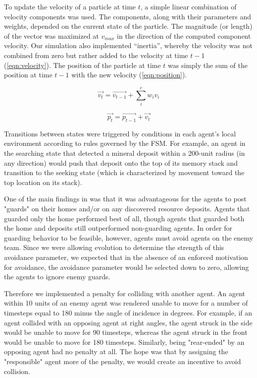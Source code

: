\documentclass[conference,final]{IEEEtran}
\begin{document}
To update the velocity of a particle at time $t$, a simple linear combination of velocity components was used. The components, along with their parameters and weights, depended on the current state of the particle. The magnitude (or length) of the vector was maximized at $v_{max}$ in the direction of the computed component velocity. Our simulation also implemented ``inertia'', whereby the velocity was not combined from zero but rather added to the velocity at time $t-1$ (\ref{eqn:velocity}). The position of the particle at time $t$ was simply the sum of the position at time $t-1$ with the new velocity (\ref{eqn:position}).

\begin{equation}
    \vec {v_t} =  \vec {v_{t-1}}+ \sum_i^c { w_i v_i}
    \label{eqn:velocity}
\end{equation}

\begin{equation}
    \vec {p_t} = \vec {p_{t-1}} + \vec {v_t}
    \label{eqn:position}
\end{equation}

Transitions between states were triggered by conditions in each agent's local environment according to rules governed by the FSM. For example, an agent in the searching state that detected a mineral deposit within a 200-unit radius (in any direction) would push that deposit onto the top of its memory stack and transition to the seeking state (which is characterized by movement toward the top location on its stack).

One of the main findings in \cite{rodriguez2004extending} was that it was advantageous for the agents to post "guards" on their homes and/or on any discovered resource deposits. Agents that guarded only the home performed best of all, though agents that guarded both the home and deposits still outperformed non-guarding agents. In order for guarding behavior to be feasible, however, agents must avoid agents on the enemy team. Since we were allowing evolution to determine the strength of this avoidance parameter, we expected that in the absence of an enforced motivation for avoidance, the avoidance parameter would be selected down to zero, allowing the agents to ignore enemy guards.

Therefore we implemented a penalty for colliding with another agent. An agent within 10 units of an enemy agent was rendered unable to move for a number of timesteps equal to 180 minus the angle of incidence in degrees. For example, if an agent collided with an opposing agent at right angles, the agent struck in the side would be unable to move for 90 timesteps, whereas the agent struck in the front would be unable to move for 180 timesteps. Similarly, being "rear-ended" by an opposing agent had no penalty at all. The hope was that by assigning the "responsible" agent more of the penalty, we would create an incentive to avoid collision.
\end{document}
